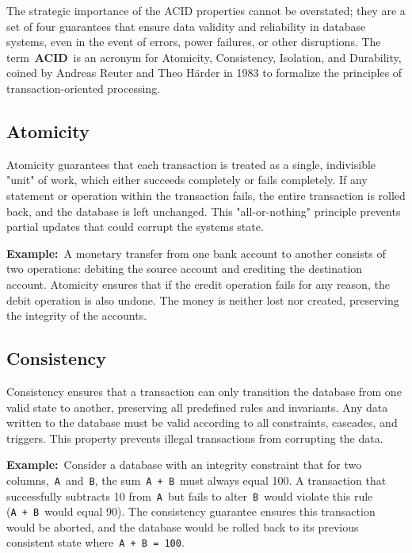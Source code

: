 \documentclass{scrbook}
\begin{document}
The strategic importance of the ACID properties cannot be overstated;
they are a set of four guarantees that ensure data validity and
reliability in database systems, even in the event of errors, power
failures, or other disruptions. The term~\textbf{ACID}~is an acronym for
Atomicity, Consistency, Isolation, and Durability, coined by Andreas
Reuter and Theo Härder in 1983 to formalize the principles of
transaction-oriented processing.

\subsection{Atomicity}

Atomicity guarantees that each transaction is treated as a single,
indivisible "unit" of work, which either succeeds completely or fails
completely. If any statement or operation within the transaction fails,
the entire transaction is rolled back, and the database is left
unchanged. This "all-or-nothing" principle prevents partial updates that
could corrupt the system\textquotesingle s state.

\textbf{Example:}~A monetary transfer from one bank account to another
consists of two operations: debiting the source account and crediting
the destination account. Atomicity ensures that if the credit operation
fails for any reason, the debit operation is also undone. The money is
neither lost nor created, preserving the integrity of the accounts.

\subsection{Consistency}

Consistency ensures that a transaction can only transition the database
from one valid state to another, preserving all predefined rules and
invariants. Any data written to the database must be valid according to
all constraints, cascades, and triggers. This property prevents illegal
transactions from corrupting the data.

\textbf{Example:}~Consider a database with an integrity constraint that
for two columns,~\texttt{A}~and~\texttt{B}, the
sum~\texttt{A\ +\ B}~must always equal 100. A transaction that
successfully subtracts 10 from~\texttt{A}~but fails to
alter~\texttt{B}~would violate this rule (\texttt{A\ +\ B}~would equal
90). The consistency guarantee ensures this transaction would be
aborted, and the database would be rolled back to its previous
consistent state where~\texttt{A\ +\ B\ =\ 100}.
\end{document}
